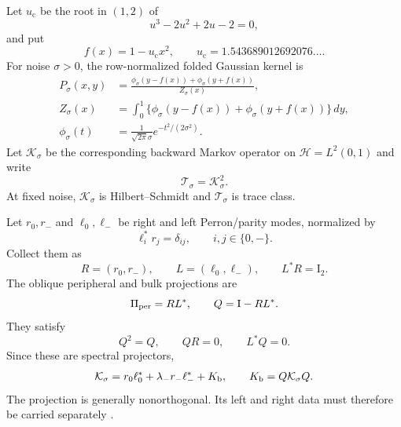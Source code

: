 \documentclass[11pt]{article}
\theoremstyle{definition}
\theoremstyle{remark}
\newcommand{\uc}{u_{\mathrm c}}
\newcommand{\Id}{\mathrm I}
\newcommand{\cK}{\mathcal K}
\newcommand{\cT}{\mathcal T}
\newcommand{\cH}{\mathcal H}
\begin{document}
Let $\uc$ be the root in $(1,2)$ of
\begin{equation}\label{eq:cubic-parameter}
 u^3-2u^2+2u-2=0,
\end{equation}
and put
\begin{equation}\label{eq:map}
 f(x)=1-\uc x^2,
 \qquad
 \uc=1.543689012692076\ldots.
\end{equation}
For noise $\sigma>0$, the row-normalized folded Gaussian kernel is
\begin{align}
 P_\sigma(x,y)
 &=\frac{\phi_\sigma(y-f(x))+\phi_\sigma(y+f(x))}{Z_\sigma(x)},
 \label{eq:kernel}\\
 Z_\sigma(x)
 &=\int_0^1\{\phi_\sigma(y-f(x))+\phi_\sigma(y+f(x))\}\,dy,
 \label{eq:normalizer}\\
 \phi_\sigma(t)&=\frac{1}{\sqrt{2\pi}\sigma}e^{-t^2/(2\sigma^2)}.
 \label{eq:normal-density}
\end{align}
Let $\cK_\sigma$ be the corresponding backward Markov operator on
$\cH=L^2(0,1)$ and write
\begin{equation}\label{eq:two-step}
 \cT_\sigma=\cK_\sigma^2.
\end{equation}
At fixed noise, $\cK_\sigma$ is Hilbert--Schmidt and $\cT_\sigma$ is trace
class.

Let $r_0,r_-$ and $\ell_0,\ell_-$ be right and left Perron/parity modes,
normalized by
\begin{equation}\label{eq:biorthogonal-modes}
 \ell_i^*r_j=\delta_{ij},
 \qquad i,j\in\{0,-\}.
\end{equation}
Collect them as
\begin{equation}\label{eq:R-L}
 R=(r_0,r_-),
 \qquad
 L=(\ell_0,\ell_-),
 \qquad
 L^*R=\Id_2.
\end{equation}
The oblique peripheral and bulk projections are
\begin{equation}\label{eq:Q}
 \Pi_{\rm per}=RL^*,
 \qquad
 Q=\Id-RL^*.
\end{equation}
They satisfy
\begin{equation}\label{eq:Q-identities}
 Q^2=Q,
 \qquad QR=0,
 \qquad L^*Q=0.
\end{equation}
Since these are spectral projectors,
\begin{equation}\label{eq:bulk-decomposition}
 \cK_\sigma
 =r_0\ell_0^*+\lambda_-r_-\ell_-^*+K_{\rm b},
 \qquad
 K_{\rm b}=Q\cK_\sigma Q.
\end{equation}
The projection is generally nonorthogonal.  Its left and right data must
therefore be carried separately \citep{Kato1995,TrefethenEmbree2005}.
\end{document}

